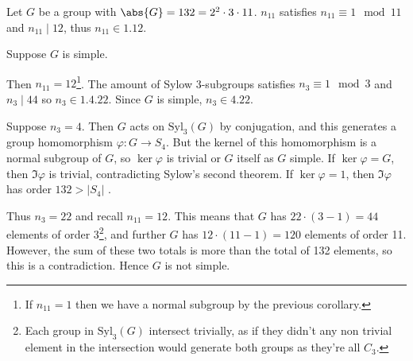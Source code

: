 \begin{example}
	Let $G$ be a group with $\abs{G} = 132 = 2^2 \cdot 3 \cdot 11$.
	$n_{11}$ satisfies $n_{11} \equiv 1 \mod 11$ and $n_{11} \mid 12$, thus $n_{11} \in \qty{1, 12}$.

	Suppose $G$ is simple.

	Then $n_{11} = 12$\footnote{If $n_{11} = 1$ then we have a normal subgroup by the previous corollary.}.
	The amount of Sylow 3-subgroups satisfies $n_3 \equiv 1 \mod 3$ and $n_3 \mid 44$ so $n_3 \in \qty{1, 4, 22}$.
	Since $G$ is simple, $n_3 \in \qty{4, 22}$.

	Suppose $n_3 = 4$.
	Then $G$ acts on $\mathrm{Syl}_3(G)$ by conjugation, and this generates a group homomorphism $\varphi \colon G \to S_4$.
	But the kernel of this homomorphism is a normal subgroup of $G$, so $\ker \varphi$ is trivial or $G$ itself as $G$ simple.
	If $\ker \varphi = G$, then $\Im \varphi$ is trivial, contradicting Sylow's second theorem.
	If $\ker \varphi = 1$, then $\Im \varphi$ has order $132 > |S_4|$ \Lightning.

	Thus $n_3 = 22$ and recall $n_{11} = 12$.
	This means that $G$ has $22 \cdot (3-1) = 44$ elements of order 3\footnote{Each group in $\mathrm{Syl}_3(G)$ intersect trivially, as if they didn't any non trivial element in the intersection would generate both groups as they're all $C_3$.}, and further $G$ has $12 \cdot (11 - 1) = 120$ elements of order 11.
	However, the sum of these two totals is more than the total of 132 elements, so this is a contradiction.
	Hence $G$ is not simple.
\end{example}
